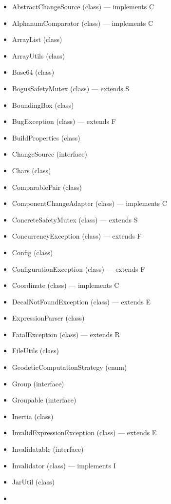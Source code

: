 \documentclass{amsdtx}
\begin{document}
\begin{itemize}
\begin{itemize}
\begin{itemize}
    \item
      AbstractChangeSource (class) --- implements C
    \item
      AlphanumComparator (class) --- implements C
    \item
      ArrayList (class)
    \item
      ArrayUtils (class)
    \item
      Base64 (class)
    \item
      BogusSafetyMutex (class) --- extends S
    \item
      BoundingBox (class)
    \item
      BugException (class) --- extends F
    \item
      BuildProperties (class)
    \item
      ChangeSource (interface)
    \item
      Chars (class)
    \item
      ComparablePair (class)
    \item
      ComponentChangeAdapter (class) --- implements C
    \item
      ConcreteSafetyMutex (class) --- extends S
    \item
      ConcurrencyException (class) --- extends F
    \item
      Config (class)
    \item
      ConfigurationException (class) --- extends F
    \item
      Coordinate (class) --- implements C
    \item
      DecalNotFoundException (class) --- extends E
    \item
      ExpressionParser (class)
    \item
      FatalException (class) --- extends R
    \item
      FileUtils (class)
    \item
      GeodeticComputationStrategy (enum)
    \item
      Group (interface)
    \item
      Groupable (interface)
    \item
      Inertia (class)
    \item
      InvalidExpressionException (class) --- extends E
    \item
      Invalidatable (interface)
    \item
      Invalidator (class) --- implements I
    \item
      JarUtil (class)
    \item

\end{itemize}
\end{itemize}
\end{itemize}
\end{document}
